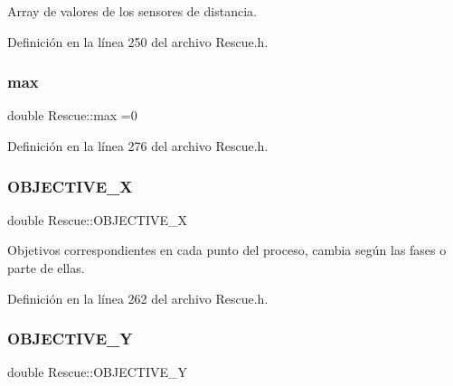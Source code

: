 Array de valores de los sensores de distancia. 



Definición en la línea 250 del archivo Rescue.\+h.

\mbox{\label{classRescue_aa1e9ec232ed1643bf2c889be84c8f4af_aa1e9ec232ed1643bf2c889be84c8f4af}} 
\subsubsection{\texorpdfstring{max}{max}}
{\footnotesize\ttfamily double Rescue\+::max =0\hspace{0.3cm}{\ttfamily [private]}}



Definición en la línea 276 del archivo Rescue.\+h.

\mbox{\label{classRescue_a8a98fdaa1deed080b4f8798f769f46cc_a8a98fdaa1deed080b4f8798f769f46cc}} 
\subsubsection{\texorpdfstring{O\+B\+J\+E\+C\+T\+I\+V\+E\+\_\+X}{OBJECTIVE\_X}}
{\footnotesize\ttfamily double Rescue\+::\+O\+B\+J\+E\+C\+T\+I\+V\+E\+\_\+X\hspace{0.3cm}{\ttfamily [private]}}



Objetivos correspondientes en cada punto del proceso, cambia según las fases o parte de ellas. 



Definición en la línea 262 del archivo Rescue.\+h.

\mbox{\label{classRescue_a54840a89d4f27081c433d70e1a78022f_a54840a89d4f27081c433d70e1a78022f}} 
\subsubsection{\texorpdfstring{O\+B\+J\+E\+C\+T\+I\+V\+E\+\_\+Y}{OBJECTIVE\_Y}}
{\footnotesize\ttfamily double Rescue\+::\+O\+B\+J\+E\+C\+T\+I\+V\+E\+\_\+Y\hspace{0.3cm}{\ttfamily [private]}}



